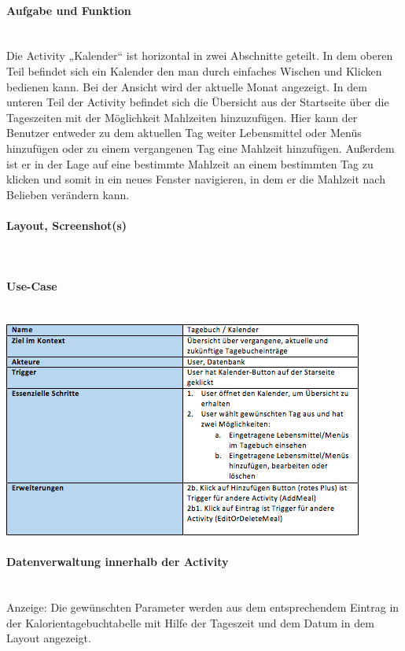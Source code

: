 \paragraph{Aufgabe und Funktion}\\
Die Activity „Kalender“ ist horizontal in zwei Abschnitte geteilt. In dem oberen Teil befindet sich ein Kalender den man durch einfaches Wischen und Klicken bedienen kann. Bei der Ansicht wird der aktuelle Monat angezeigt.
In dem unteren Teil der Activity befindet sich die Übersicht aus der Startseite über die Tageszeiten mit der Möglichkeit Mahlzeiten hinzuzufügen. Hier kann der Benutzer entweder zu dem aktuellen Tag weiter Lebensmittel oder Menüs hinzufügen oder zu einem vergangenen Tag eine Mahlzeit hinzufügen. Außerdem ist er in der Lage auf eine bestimmte Mahlzeit an einem bestimmten Tag zu klicken und somit in ein neues Fenster navigieren, in dem er die Mahlzeit nach Belieben verändern kann. 

\paragraph{Layout, Screenshot(s)}\\
\paragraph{Use-Case}$~~$\\
\newline
\includegraphics[scale=1]{img/usecasecalendar}\\
\paragraph{Datenverwaltung innerhalb der Activity}\\
Anzeige: Die gewünschten Parameter werden aus dem entsprechendem Eintrag in der Kalorientagebuchtabelle mit Hilfe der Tageszeit und dem Datum in dem Layout angezeigt.

